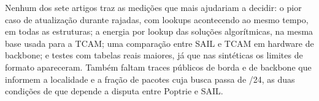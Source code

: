 \documentclass[conference,a4paper]{IEEEtran}
\begin{document}
Nenhum dos sete artigos traz as medições que mais ajudariam a decidir: o pior caso de atualização durante rajadas, com
lookups acontecendo ao mesmo tempo, em todas as estruturas; a energia por lookup das soluções algorítmicas, na mesma base
usada para a TCAM; uma comparação entre SAIL e TCAM em hardware de backbone; e testes com tabelas reais maiores, já que nas
sintéticas os limites de formato apareceram. Também faltam traces públicos de borda e de backbone que informem a localidade e
a fração de pacotes cuja busca passa de /24, as duas condições de que depende a disputa entre Poptrie e SAIL.



\end{document}
